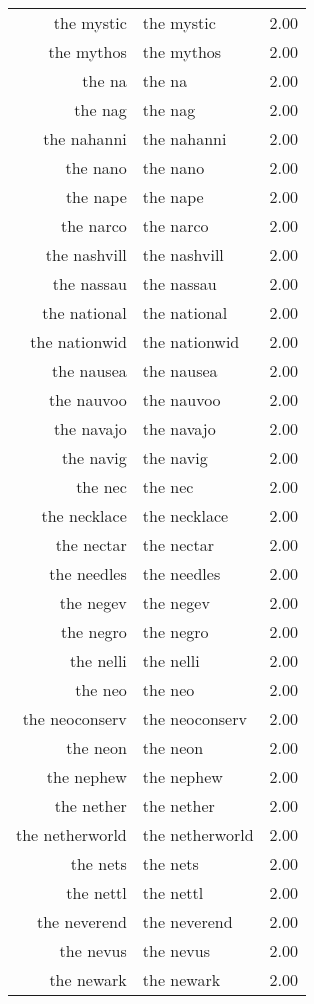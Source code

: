\begin{table}[ht]
\begin{tabular}{rlr}
  the mystic & the mystic & 2.00 \\ 
  the mythos & the mythos & 2.00 \\ 
  the na & the na & 2.00 \\ 
  the nag & the nag & 2.00 \\ 
  the nahanni & the nahanni & 2.00 \\ 
  the nano & the nano & 2.00 \\ 
  the nape & the nape & 2.00 \\ 
  the narco & the narco & 2.00 \\ 
  the nashvill & the nashvill & 2.00 \\ 
  the nassau & the nassau & 2.00 \\ 
  the national & the national & 2.00 \\ 
  the nationwid & the nationwid & 2.00 \\ 
  the nausea & the nausea & 2.00 \\ 
  the nauvoo & the nauvoo & 2.00 \\ 
  the navajo & the navajo & 2.00 \\ 
  the navig & the navig & 2.00 \\ 
  the nec & the nec & 2.00 \\ 
  the necklace & the necklace & 2.00 \\ 
  the nectar & the nectar & 2.00 \\ 
  the needles & the needles & 2.00 \\ 
  the negev & the negev & 2.00 \\ 
  the negro & the negro & 2.00 \\ 
  the nelli & the nelli & 2.00 \\ 
  the neo & the neo & 2.00 \\ 
  the neoconserv & the neoconserv & 2.00 \\ 
  the neon & the neon & 2.00 \\ 
  the nephew & the nephew & 2.00 \\ 
  the nether & the nether & 2.00 \\ 
  the netherworld & the netherworld & 2.00 \\ 
  the nets & the nets & 2.00 \\ 
  the nettl & the nettl & 2.00 \\ 
  the neverend & the neverend & 2.00 \\ 
  the nevus & the nevus & 2.00 \\ 
  the newark & the newark & 2.00 \\ 

\end{tabular}
\end{table}
